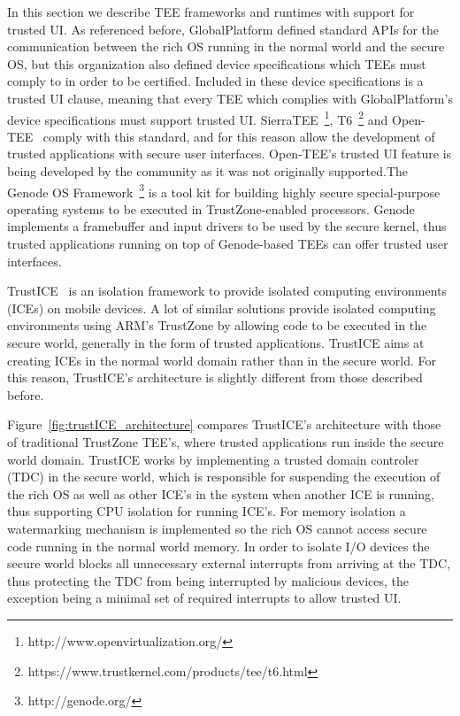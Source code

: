 In this section we describe TEE frameworks and runtimes with support for trusted UI. As referenced before, GlobalPlatform defined standard APIs for the communication between the rich OS running in the normal world and the secure OS, but this organization also defined device specifications which TEEs must comply to in order to be certified. Included in these device specifications is a trusted UI clause, meaning that every TEE which complies with GlobalPlatform's device specifications must support trusted UI. SierraTEE~\footnote{http://www.openvirtualization.org/}, T6~\footnote{https://www.trustkernel.com/products/tee/t6.html} and Open-TEE~\cite{mcgillion2015open} comply with this standard, and for this reason allow the development of trusted applications with secure user interfaces. Open-TEE's trusted UI feature is being developed by the community as it was not originally supported.The Genode OS Framework~\footnote{http://genode.org/} is a tool kit for building highly secure special-purpose operating systems to be executed in TrustZone-enabled processors. Genode implements a framebuffer and input drivers to be used by the secure kernel, thus trusted applications running on top of Genode-based TEEs can offer trusted user interfaces.

TrustICE~\cite{sun2015trustice} is an isolation framework to provide isolated computing environments (ICEs) on mobile devices. A lot of similar solutions provide isolated computing environments using ARM's TrustZone by allowing code to be executed in the secure world, generally in the form of trusted applications. TrustICE aims at creating ICEs in the normal world domain rather than in the secure world. For this reason, TrustICE's architecture is slightly different from those described before.

Figure~\ref{fig:trustICE_architecture} compares TrustICE's architecture with those of traditional TrustZone TEE's, where trusted applications run inside the secure world domain. TrustICE works by implementing a trusted domain controler (TDC) in the secure world, which is responsible for suspending the execution of the rich OS as well as other ICE's in the system when another ICE is running, thus supporting CPU isolation for running ICE's. For memory isolation a watermarking mechanism is implemented so the rich OS cannot access secure code running in the normal world memory. In order to isolate I/O devices the secure world blocks all unnecessary external interrupts from arriving at the TDC, thus protecting the TDC from being interrupted by malicious devices, the exception being a minimal set of required interrupts to allow trusted UI.

